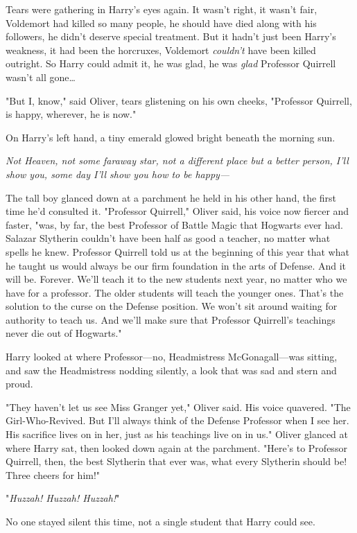 Tears were gathering in Harry's eyes again. It wasn't right, it wasn't fair,
Voldemort had killed so many people, he should have died along with his
followers, he didn't deserve special treatment. But it hadn't just been Harry's
weakness, it had been the horcruxes, Voldemort \emph{couldn't} have been killed
outright. So Harry could admit it, he was glad, he was \emph{glad} Professor
Quirrell wasn't all gone{\ldots}

"But I, know," said Oliver, tears glistening on his own cheeks, "Professor
Quirrell, is happy, wherever, he is now."

On Harry's left hand, a tiny emerald glowed bright beneath the morning sun.

\emph{Not Heaven, not some faraway star, not a different place but a better
person, I'll show you, some day I'll show you how to be happy---}

The tall boy glanced down at a parchment he held in his other hand, the first
time he'd consulted it. "Professor Quirrell," Oliver said, his voice now
fiercer and faster, "was, by far, the best Professor of Battle Magic that
Hogwarts ever had. Salazar Slytherin couldn't have been half as good a teacher,
no matter what spells he knew. Professor Quirrell told us at the beginning of
this year that what he taught us would always be our firm foundation in the
arts of Defense. And it will be. Forever. We'll teach it to the new students
next year, no matter who we have for a professor. The older students will teach
the younger ones. That's the solution to the curse on the Defense position. We
won't sit around waiting for authority to teach us. And we'll make sure that
Professor Quirrell's teachings never die out of Hogwarts."

Harry looked at where Professor---no, Headmistress McGonagall---was sitting,
and saw the Headmistress nodding silently, a look that was sad and stern and
proud.

"They haven't let us see Miss Granger yet," Oliver said. His voice quavered.
"The Girl-Who-Revived. But I'll always think of the Defense Professor when I
see her. His sacrifice lives on in her, just as his teachings live on in us."
Oliver glanced at where Harry sat, then looked down again at the parchment.
"Here's to Professor Quirrell, then, the best Slytherin that ever was, what
every Slytherin should be! Three cheers for him!"

"\emph{Huzzah! Huzzah! Huzzah!}"

No one stayed silent this time, not a single student that Harry could see.

